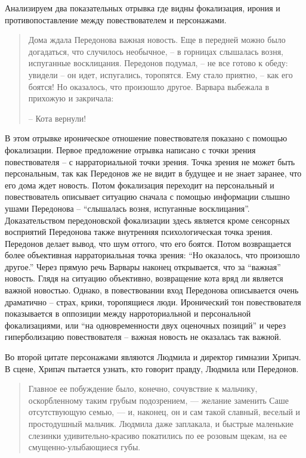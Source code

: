 \documentclass[12pt,a4paper]{article}
\begin{document}
Анализируем два показательных отрывка где видны фокализация, ирония и противопоставление между повествователем и персонажами.

\begin{quote}
Дома ждала Передонова важная новость. Еще в передней можно
было догадаться, что случилось необычное, – в горницах слышалась
возня, испуганные восклицания. Передонов подумал, – не все
готово к обеду: увидели – он идет, испугались, торопятся. Ему стало
приятно, – как его боятся! Но оказалось, что произошло другое.
Варвара выбежала в прихожую и закричала:

– Кота вернули!

\parencite[171.]{sologub2004}

\end{quote}

В этом отрывке ироническое отношение повествователя показано с помощью фокализации. Первое предложение отрывка написано с точки зрения повествователя – с нарраториальной точки зрения. Точка зрения не может быть персональным, так как Передонов же не видит в будущее и не знает заранее, что его дома ждет новость. Потом фокализация переходит на персональный и повествователь описывает ситуацию сначала с помощью информации слышно ушами Передонова – \enquote{слышалась
возня, испуганные восклицания}. Доказательством передоновской фокализации здесь является кроме сенсорных восприятий Передонова также внутренняя психологическая точка зрения. Передонов делает вывод, что шум оттого, что его боятся. Потом возвращается более объективная нарраториальная точка зрения: \enquote{Но оказалось, что произошло другое.} Через прямую речь Варвары наконец открывается, что за \enquote{важная} новость.
Глядя на ситуацию объективно, возвращение кота вряд ли является  важной новостью. Однако, в повествовании вход Передонова описывается очень драматично – страх, крики, торопящиеся люди. Иронический тон повествователя показывается  в оппозиции между нарроториальной и персональной фокализациями, или \enquote{на одновременности двух оценочных позиций} и через гиперболизацию повествователя – важная новость не оказалась так важной.

Во второй цитате персонажами являются Людмила и директор гимназии Хрипач. В сцене, Хрипач пытается узнать, кто говорит правду, Людмила или Передонов.

\begin{quote}
Главное ее побуждение было,
конечно, сочувствие к мальчику, оскорбленному таким грубым
подозрением, — желание заменить Саше отсутствующую семью, — и,
наконец, он и сам такой славный, веселый и простодушный мальчик.
Людмила даже заплакала, и быстрые маленькие слезинки
удивительно-красиво покатились по ее розовым щекам, на ее смущенно-улыбающиеся
губы.

\parencite[239.]{sologub2004}
\end{quote}
\end{document}
